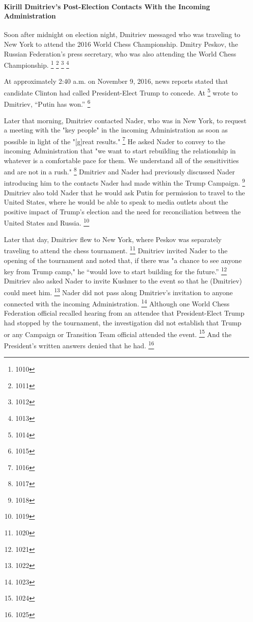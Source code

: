 \paragraph{Kirill Dmitriev's Post-Election Contacts With the Incoming Administration}

Soon after midnight on election night, Dmitriev messaged
who was traveling to New York to attend the 2016 World Chess Championship.
Dmitry Peskov, the Russian Federation's press secretary, who was also attending the World Chess Championship.%
\footnote{1010}
\footnote{1011}
\footnote{1012}
\footnote{1013}

At approximately 2:40 a.m. on November 9, 2016, news reports stated that candidate Clinton had called President-Elect Trump to concede.
At
\footnote{1014}
wrote to Dmitriev, ``Putin has won.''%
\footnote{1015}

Later that morning, Dmitriev contacted Nader, who was in New York, to request a meeting with the "key people" in the incoming Administration as soon as possible in light of the "[g]reat results."%
\footnote{1016}
He asked Nader to convey to the incoming Administration that "we want to start rebuilding the relationship in whatever is a comfortable pace for them.
We understand all of the sensitivities and are not in a rush."%
\footnote{1017}
Dmitriev and Nader had previously discussed Nader introducing him to the contacts Nader had made within the Trump Campaign.%
\footnote{1018}
Dmitriev also told Nader that he would ask Putin for permission to travel to the United States, where he would be able to speak to media outlets about the positive impact of Trump's election and the need for reconciliation between the United States and Russia.%
\footnote{1019}

Later that day, Dmitriev flew to New York, where Peskov was separately traveling to attend the chess tournament.%
\footnote{1020}
Dmitriev invited Nader to the opening of the tournament and noted that, if there was "a chance to see anyone key from Trump camp," he ``would love to start building for the future.''%
\footnote{1021}
Dmitriev also asked Nader to invite Kushner to the event so that he (Dmitriev) could meet him.%
\footnote{1022}
Nader did not pass along Dmitriev's invitation to anyone connected with the incoming Administration.%
\footnote{1023}
Although one World Chess Federation official recalled hearing from an attendee that President-Elect Trump had stopped by the tournament, the investigation did not establish that Trump or any Campaign or Transition Team official attended the event.%
\footnote{1024}
And the President's written answers denied that he had.%
\footnote{1025}

